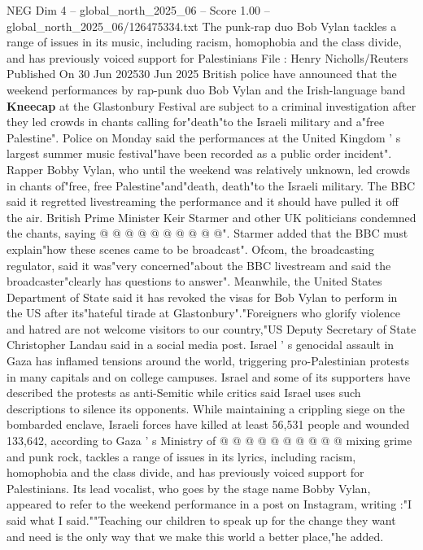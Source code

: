 \begin{textsample}{NEG Dim 4 – global\_north\_2025\_06 – Score 1.00 – global\_north\_2025\_06/126475334.txt}  \label{ex:f4_neg_075}
The punk-rap duo Bob Vylan tackles a range of issues in its music, including racism, homophobia and the class divide, and has previously voiced support for Palestinians File : Henry Nicholls/Reuters Published On 30 Jun 202530 Jun 2025 British police have announced that the weekend performances by rap-punk duo Bob Vylan and the Irish-language band \textbf{Kneecap} at the Glastonbury Festival are subject to a criminal investigation after they led crowds in chants calling for"death"to the Israeli military and a"free Palestine".
Police on Monday said the performances at the United Kingdom ' s largest summer music festival"have been recorded as a public order incident".
Rapper Bobby Vylan, who until the weekend was relatively unknown, led crowds in chants of"free, free Palestine"and"death, death"to the Israeli military.
The BBC said it regretted livestreaming the performance and it should have pulled it off the air.
British Prime Minister Keir Starmer and other UK politicians condemned the chants, saying @ @ @ @ @ @ @ @ @ @".
Starmer added that the BBC must explain"how these scenes came to be broadcast".
Ofcom, the broadcasting regulator, said it was"very concerned"about the BBC livestream and said the broadcaster"clearly has questions to answer".
Meanwhile, the United States Department of State said it has revoked the visas for Bob Vylan to perform in the US after its"hateful tirade at Glastonbury"."Foreigners who glorify violence and hatred are not welcome visitors to our country,"US Deputy Secretary of State Christopher Landau said in a social media post.
Israel ' s genocidal assault in Gaza has inflamed tensions around the world, triggering pro-Palestinian protests in many capitals and on college campuses.
Israel and some of its supporters have described the protests as anti-Semitic while critics said Israel uses such descriptions to silence its opponents.
While maintaining a crippling siege on the bombarded enclave, Israeli forces have killed at least 56,531 people and wounded 133,642, according to Gaza ' s Ministry of @ @ @ @ @ @ @ @ @ @ mixing grime and punk rock, tackles a range of issues in its lyrics, including racism, homophobia and the class divide, and has previously voiced support for Palestinians.
Its lead vocalist, who goes by the stage name Bobby Vylan, appeared to refer to the weekend performance in a post on Instagram, writing :"I said what I said.""Teaching our children to speak up for the change they want and need is the only way that we make this world a better place,"he added.

\end{textsample}
